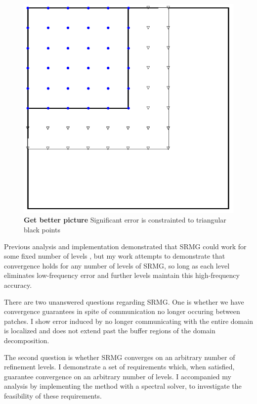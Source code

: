 \documentclass[final]{siamart1116}
\numberwithin{theorem}{section}
\begin{document}
\begin{figure}
  \begin{center}
    \includegraphics[scale=0.4]{sketchsr.pdf}
  \end{center}
  \caption*{\textbf{Get better picture} \footnotesize{Significant error is constrainted to triangular black points}}
\end{figure}


	Previous analysis and implementation demonstrated that SRMG could work for some fixed number of levels \cite{paper1}, but my work attempts to demonstrate that convergence holds for any number of levels of SRMG, so long as each level eliminates low-frequency error and further levels maintain this high-frequency accuracy. 
    
	There are two unanswered questions regarding SRMG. One is whether we have convergence guarantees in spite of communication no longer occuring between patches.  I show error induced by no longer communicating with the entire domain is localized and does not extend past the buffer regions of the domain decomposition. 
    
	The second question is whether SRMG converges on an arbitrary number of refinement levels. I demonstrate a set of requirements which, when satisfied, guarantee convergence on an arbitrary number of levels. I accompanied my analysis by implementing the method with a spectral solver, to investigate the feasibility of these requirements. 
    
\end{document}
